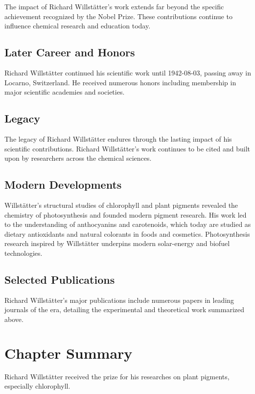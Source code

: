 The impact of Richard Willstätter's work extends far beyond the specific achievement recognized by the Nobel Prize.
These contributions continue to influence chemical research and education today.

\subsection*{Later Career and Honors}

Richard Willstätter continued his scientific work until 1942-08-03, passing away in Locarno, Switzerland.
He received numerous honors including membership in major scientific academies and societies.

\subsection*{Legacy}

The legacy of Richard Willstätter endures through the lasting impact of his scientific contributions.
Richard Willstätter's work continues to be cited and built upon by researchers across the chemical sciences.

\subsection*{Modern Developments}

Willstätter's structural studies of chlorophyll and plant pigments revealed the chemistry of photosynthesis and founded modern pigment research. His work led to the understanding of anthocyanins and carotenoids, which today are studied as dietary antioxidants and natural colorants in foods and cosmetics. Photosynthesis research inspired by Willstätter underpins modern solar-energy and biofuel technologies.

\subsection*{Selected Publications}

Richard Willstätter's major publications include numerous papers in leading journals of the era, detailing the experimental and theoretical work summarized above.

\clearpage

\section*{Chapter Summary}

Richard Willstätter received the prize for his researches on plant pigments, especially chlorophyll.
